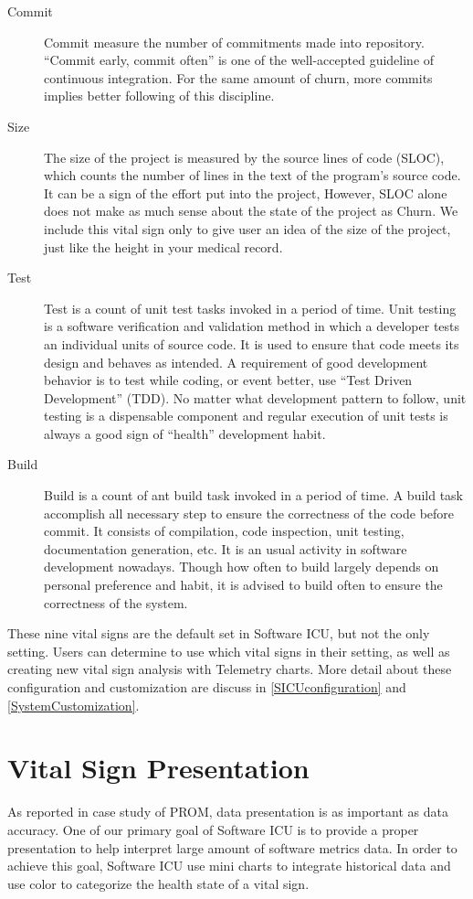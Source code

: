 \begin{description}
\item[Commit] 
Commit measure the number of commitments made into repository. ``Commit early, commit often'' is one of the well-accepted guideline of continuous integration. For the same amount of churn, more commits implies better following of this discipline.

\item[Size] 
The size of the project is measured by the source lines of code (SLOC), which counts the number of lines in the text of the program's source code. It can be a sign of the effort put into the project, However, SLOC alone does not make as much sense about the state of the project as Churn. We include this vital sign only to give user an idea of the size of the project, just like the height in your medical record.

\item[Test] 
Test is a count of unit test tasks invoked in a period of time. Unit testing is a software verification and validation method in which a developer tests an individual units of source code. It is used to ensure that code meets its design and behaves as intended. A requirement of good development behavior is to test while coding, or event better, use ``Test Driven Development'' (TDD). No matter what development pattern to follow, unit testing is a dispensable component and regular execution of unit tests is always a good sign of ``health'' development habit.

\item[Build] 
Build is a count of ant build task invoked in a period of time. A build task accomplish all necessary step to ensure the correctness of the code before commit. It consists of compilation, code inspection, unit testing, documentation generation, etc. It is an usual activity in software development nowadays. Though how often to build largely depends on personal preference and habit, it is advised to build often to ensure the correctness of the system.

\end{description}

These nine vital signs are the default set in Software ICU, but not the only setting. Users can determine to use which vital signs in their setting, as well as creating new vital sign analysis with Telemetry charts. More detail about these configuration and customization are discuss in \autoref{SICUconfiguration} and \autoref{SystemCustomization}.

\section{Vital Sign Presentation}
\label{presentation}
As reported in case study of PROM, data presentation is as important as data accuracy\cite{prom09}. One of our primary goal of Software ICU is to provide a proper presentation to help interpret large amount of software metrics data. In order to achieve this goal, Software ICU use mini charts to integrate historical data and use color to categorize the health state of a vital sign.

